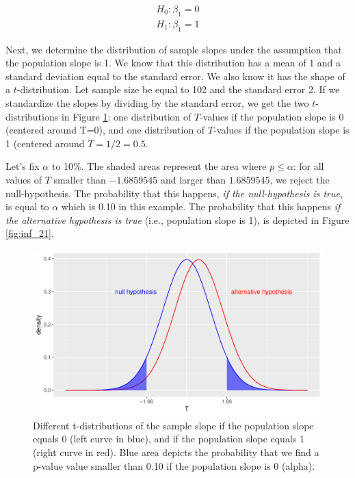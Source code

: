 \documentclass[]{report}\usepackage[]{graphicx}\usepackage[]{color}
\makeatletter
\def\maxwidth{ %
  \ifdim\Gin@nat@width>\linewidth
    \linewidth
  \else
    \Gin@nat@width
  \fi
}
\newenvironment{knitrout}{}{} %
\makeatother
\begin{document}
\begin{eqnarray}
H_0: \beta_1 =0 \nonumber \\
H_1: \beta_1 = 1\nonumber
\end{eqnarray}


Next, we determine the distribution of sample slopes under the assumption that the population slope is 1. We know that this distribution has a mean of 1 and a standard deviation equal to the standard error. We also know it has the shape of a $t$-distribution. Let sample size be equal to 102 and the standard error 2. If we standardize the slopes by dividing by the standard error, we get the two $t$-distributions in Figure \ref{fig:inf_20}: one distribution of $T$-values if the population slope is 0 (centered around T=0), and one distribution of $T$-values if the population slope is 1 (centered around $T=1/2=0.5$.

Let's fix $\alpha$ to 10\%. The shaded areas represent the area where $p \leq \alpha$: for all values of $T$ smaller than $-1.6859545$ and larger than $1.6859545$, we reject the null-hypothesis. The probability that this happens, \textit{if the null-hypothesis is true}, is equal to $\alpha$ which is 0.10 in this example. The probability that this happens \textit{if the alternative hypothesis is true} (i.e., population slope is 1), is depicted in Figure \ref{fig:inf_21}.


\begin{knitrout}
\color{fgcolor}\begin{figure}

{\centering \includegraphics[width=\maxwidth]{figure/inf_20-1} 

}

\caption[Different t-distributions of the sample slope if the population slope equals 0 (left curve in blue), and if the population slope equals 1 (right curve in red)]{Different t-distributions of the sample slope if the population slope equals 0 (left curve in blue), and if the population slope equals 1 (right curve in red). Blue area depicts the probability that we find a p-value value smaller than 0.10 if the population slope is 0 (alpha).}\label{fig:inf_20}
\end{figure}


\end{knitrout}
\end{document}
